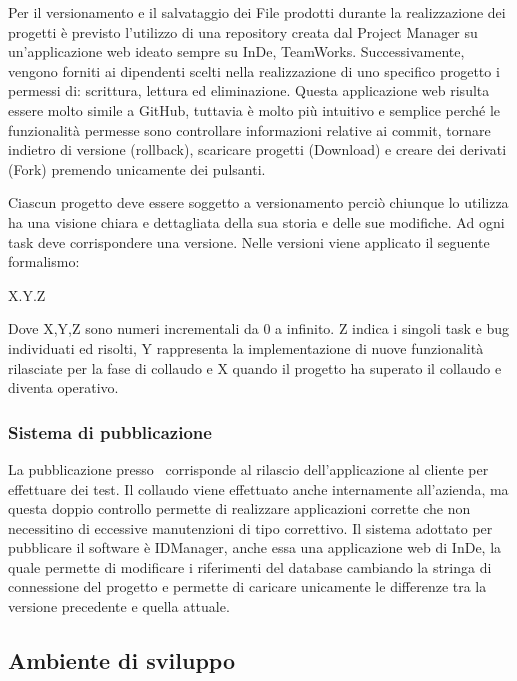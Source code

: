 Per il versionamento e il salvataggio dei File prodotti durante la realizzazione dei progetti è previsto l'utilizzo di una repository creata dal Project Manager su un'applicazione web ideato sempre su InDe, TeamWorks. Successivamente, vengono forniti ai dipendenti scelti nella realizzazione di uno specifico progetto i permessi di: scrittura, lettura ed eliminazione.
Questa applicazione web risulta essere molto simile a GitHub, tuttavia è molto più intuitivo e semplice perché le funzionalità permesse sono controllare informazioni relative ai commit, tornare indietro di versione (rollback), scaricare progetti (Download) e creare dei derivati (Fork) premendo unicamente dei pulsanti.

Ciascun progetto deve essere soggetto a versionamento perciò chiunque lo utilizza ha una visione chiara e dettagliata della sua storia e delle sue modifiche. Ad ogni task deve corrispondere una versione. Nelle versioni viene applicato il seguente formalismo:
\begin{center}
	X.Y.Z
\end{center}
Dove X,Y,Z sono numeri incrementali da 0 a infinito. 
Z indica i singoli task e bug individuati ed risolti, Y rappresenta la implementazione di nuove funzionalità rilasciate per la fase di collaudo e X quando il progetto ha superato il collaudo e diventa operativo.  

\subsubsection{Sistema di pubblicazione}
La pubblicazione presso \azienda\ corrisponde al rilascio dell'applicazione al cliente per effettuare dei test. Il collaudo viene effettuato anche internamente all'azienda, ma questa doppio controllo permette di realizzare applicazioni corrette che non necessitino di eccessive manutenzioni di tipo correttivo. 
Il sistema adottato per pubblicare il software è IDManager, anche essa una applicazione web di InDe, la quale permette di modificare i riferimenti del database cambiando la stringa di connessione del progetto e permette di caricare unicamente le differenze tra la versione precedente e quella attuale.


\subsection{Ambiente di sviluppo}
\label{cap1:Ambiente di sviluppo}

